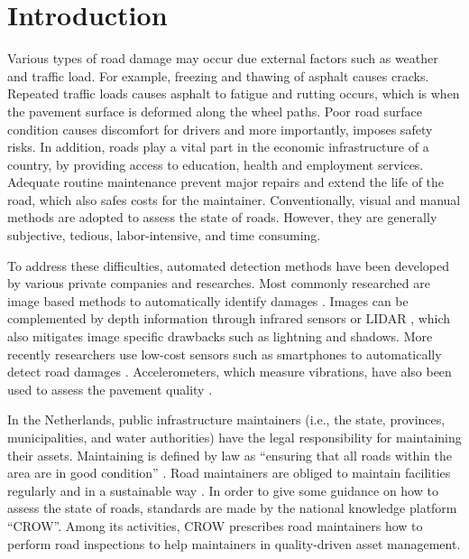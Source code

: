\clearpage
\section{Introduction}

Various types of road damage may occur due external factors such as weather and traffic load. For example, freezing and thawing of asphalt causes cracks. Repeated traffic loads causes asphalt to fatigue and rutting occurs, which is when the pavement surface is deformed along the wheel paths. Poor road surface condition causes discomfort for drivers and more importantly, imposes safety risks. In addition, roads play a vital part in the economic infrastructure of a country, by providing access to education, health and employment services. Adequate routine maintenance prevent major repairs and extend the life of the road, which also safes costs for the maintainer. Conventionally, visual and manual methods are adopted to assess the state of roads. However, they are generally subjective, tedious, labor-intensive, and time consuming. 

To address these difficulties, automated detection methods have been developed by various private companies and researches. Most commonly researched are image based methods to automatically identify damages \cite{Jahanshahi2012,Zhang2016}. Images can be complemented by depth information through infrared sensors or LIDAR \cite{Zhang2017}, which also mitigates image specific drawbacks such as lightning and shadows. More recently researchers use low-cost sensors such as smartphones to automatically detect road damages \cite{Chatterjee2018,Maeda2018,Maeda2020}. Accelerometers, which measure vibrations, have also been used to assess the pavement quality \cite{Hanson2014,Buttlar2014,Gupta2020}. 

In the Netherlands, public infrastructure maintainers (i.e., the state, provinces, municipalities, and water authorities) have the legal responsibility for maintaining their assets. Maintaining is defined by law as ``ensuring that all roads within the area are in good condition'' \cite{Wegenwet}. Road maintainers are obliged to maintain facilities regularly and in a sustainable way \cite{BurgerlijkWetbook6:174}. In order to give some guidance on how to assess the state of roads, standards are made by the national knowledge platform ``CROW''. Among its activities, CROW prescribes road maintainers how to perform road inspections \cite{CROW_147} to help maintainers in quality-driven asset management. 

